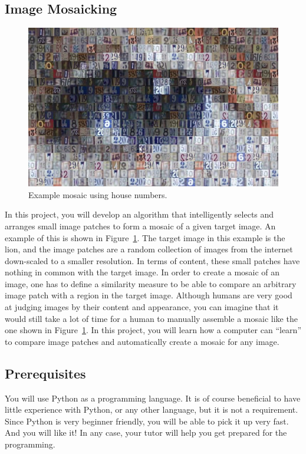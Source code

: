 \documentclass[a4paper]{article}
\begin{document}
	\subsection{Image Mosaicking}
		\begin{figure}
			\centering
			\includegraphics[width=0.7\linewidth]{eye-mosaic}
			\caption{Example mosaic using house numbers.}
			\label{fig:mosaicking-example}
		\end{figure}
		In this project, you will develop an algorithm that intelligently selects and arranges small image patches to form a mosaic of a given target image.
		An example of this is shown in Figure~\ref{fig:mosaicking-example}. 
		The target image in this example is the lion, and the image patches are a random collection of images from the internet down-scaled to a smaller resolution.
		In terms of content, these small patches have nothing in common with the target image.
		In order to create a mosaic of an image, one has to define a similarity measure to be able to compare an arbitrary image patch with a region in the target image. 
		Although humans are very good at judging images by their content and appearance, you can imagine that it would still take a lot of time for a human to manually assemble a mosaic like the one shown in Figure~\ref{fig:mosaicking-example}.
		In this project, you will learn how a computer can ``learn'' to compare image patches and automatically create a mosaic for any image.
	
	\subsection{Prerequisites}
		You will use Python as a programming language. 
		It is of course beneficial to have little experience with Python, or any other language, but it is not a requirement.
		Since Python is very beginner friendly, you will be able to pick it up very fast. 
		And you will like it!
		In any case, your tutor will help you get prepared for the programming.
		
\end{document}
